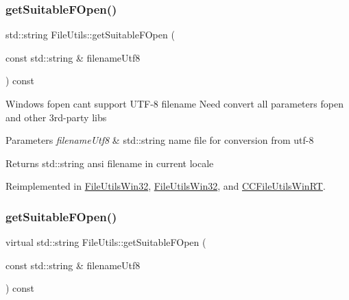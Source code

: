 \subsubsection{\texorpdfstring{get\+Suitable\+F\+Open()}{getSuitableFOpen()}\hspace{0.1cm}{\footnotesize\ttfamily [1/2]}}
{\footnotesize\ttfamily std\+::string File\+Utils\+::get\+Suitable\+F\+Open (\begin{DoxyParamCaption}\item[{const std\+::string \&}]{filename\+Utf8 }\end{DoxyParamCaption}) const\hspace{0.3cm}{\ttfamily [virtual]}}

Windows fopen can\textquotesingle{}t support U\+T\+F-\/8 filename Need convert all parameters fopen and other 3rd-\/party libs


\begin{DoxyParams}{Parameters}
{\em filename\+Utf8} & std\+::string name file for conversion from utf-\/8 \\
\hline
\end{DoxyParams}
\begin{DoxyReturn}{Returns}
std\+::string ansi filename in current locale 
\end{DoxyReturn}


Reimplemented in \hyperlink{classFileUtilsWin32_a4e2aff9afbff7e4bac487f626186dac0}{File\+Utils\+Win32}, \hyperlink{classFileUtilsWin32_a39228d2480a9b1343516bb9f1abe06b1}{File\+Utils\+Win32}, and \hyperlink{classCCFileUtilsWinRT_a655652f655870c93e5fd01259b3eca6b}{C\+C\+File\+Utils\+Win\+RT}.

\mbox{\label{classFileUtils_ab4cf90cd6dd8c8ba0b6b37b53bbd3ae8}} 
\subsubsection{\texorpdfstring{get\+Suitable\+F\+Open()}{getSuitableFOpen()}\hspace{0.1cm}{\footnotesize\ttfamily [2/2]}}
{\footnotesize\ttfamily virtual std\+::string File\+Utils\+::get\+Suitable\+F\+Open (\begin{DoxyParamCaption}\item[{const std\+::string \&}]{filename\+Utf8 }\end{DoxyParamCaption}) const\hspace{0.3cm}{\ttfamily [virtual]}}

